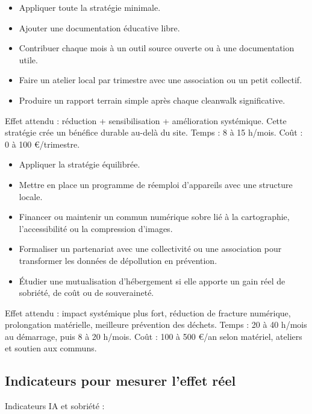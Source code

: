 \documentclass[
  10pt,
  a4paper,
  DIV=11,
  numbers=noendperiod,
  oneside]{scrreprt}
\providecommand{\tightlist}{%
  \setlength{\itemsep}{0pt}\setlength{\parskip}{0pt}}
\begin{document}
\begin{itemize}
\tightlist
\item
  Appliquer toute la stratégie minimale.
\item
  Ajouter une documentation éducative libre.
\item
  Contribuer chaque mois à un outil source ouverte ou à une
  documentation utile.
\item
  Faire un atelier local par trimestre avec une association ou un petit
  collectif.
\item
  Produire un rapport terrain simple après chaque cleanwalk
  significative.
\end{itemize}

Effet attendu : réduction + sensibilisation + amélioration systémique.
Cette stratégie crée un bénéfice durable au-delà du site. Temps : 8 à 15
h/mois. Coût : 0 à 100 €/trimestre.

\begin{itemize}
\tightlist
\item
  Appliquer la stratégie équilibrée.
\item
  Mettre en place un programme de réemploi d'appareils avec une
  structure locale.
\item
  Financer ou maintenir un commun numérique sobre lié à la cartographie,
  l'accessibilité ou la compression d'images.
\item
  Formaliser un partenariat avec une collectivité ou une association
  pour transformer les données de dépollution en prévention.
\item
  Étudier une mutualisation d'hébergement si elle apporte un gain réel
  de sobriété, de coût ou de souveraineté.
\end{itemize}

Effet attendu : impact systémique plus fort, réduction de fracture
numérique, prolongation matérielle, meilleure prévention des déchets.
Temps : 20 à 40 h/mois au démarrage, puis 8 à 20 h/mois. Coût : 100 à
500 €/an selon matériel, ateliers et soutien aux communs.

\subsection{Indicateurs pour mesurer l'effet
réel}\label{indicateurs-pour-mesurer-leffet-ruxe9el}

Indicateurs IA et sobriété :
\end{document}
